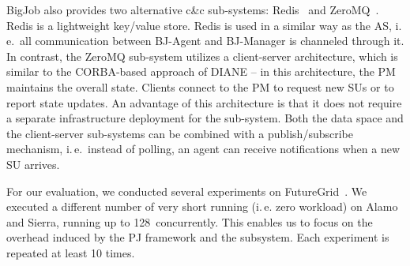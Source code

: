 \documentclass{sig-alternate}
\begin{document}
BigJob also provides two alternative c\&c sub-systems:
Redis~\cite{redis} and ZeroMQ~\cite{zmq}. Redis is a lightweight
key/value store. Redis is used in a similar way as the AS, i.\,e.\ all 
communication between BJ-Agent and BJ-Manager is
channeled through it. In contrast, the ZeroMQ sub-system utilizes a
client-server architecture, which is similar to the CORBA-based approach 
of DIANE -- in this architecture, the PM maintains the
overall state. Clients connect to the PM to request new SUs or to
report state updates. An advantage of this architecture is that it
does not require a separate infrastructure deployment for the \cc
sub-system.
%
% 
%
Both the data space and the client-server \cc sub-systems can be
combined with a publish/subscribe mechanism, i.\,e.\ instead of
polling, an agent can receive notifications when a new SU arrives.

For our \cc evaluation, we conducted several experiments on
FutureGrid~\cite{fg}. We executed a different number of very short running
(i.\,e. zero workload) \cus on Alamo and Sierra, running up to 128\,\cus 
concurrently.  This enables us to focus on the overhead induced
by the PJ framework and the \cc subsystem. Each experiment is
repeated at least 10 times.



\end{document}
